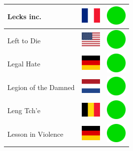 \documentclass[12pt, a4paper, twoside]{report}
\begin{document}
\begin{center}
\begin{longtable}{|p{5cm}|p{2cm}|p{2cm}|}
 Lecks inc.                                                 & \includegraphics[width=1cm]{../4x3/fr} &   \includegraphics[width=1cm]{../likes/y} \\ \hline
 Left to Die                                                & \includegraphics[width=1cm]{../4x3/us} &   \includegraphics[width=1cm]{../likes/y} \\ \hline
 Legal Hate                                                 & \includegraphics[width=1cm]{../4x3/de} &   \includegraphics[width=1cm]{../likes/y} \\ \hline
 Legion of the Damned                                       & \includegraphics[width=1cm]{../4x3/nl} &   \includegraphics[width=1cm]{../likes/y} \\ \hline
 Leng Tch'e                                                 & \includegraphics[width=1cm]{../4x3/be} &   \includegraphics[width=1cm]{../likes/y} \\ \hline
 Lesson in Violence                                         & \includegraphics[width=1cm]{../4x3/de} &   \includegraphics[width=1cm]{../likes/y} \\ \hline

\end{longtable}
\end{center}
\end{document}
